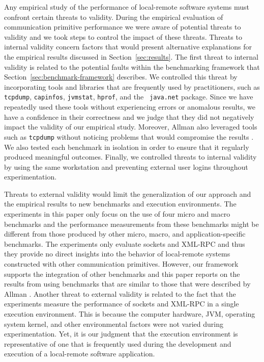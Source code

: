 \documentclass{sig-alternate}
\begin{document}
Any empirical study of the performance of local-remote software
systems must confront certain threats to validity.  During the
empirical evaluation of communication primitive performance we were
aware of potential threats to validity and we took steps to control
the impact of these threats.  Threats to internal validity concern
factors that would present alternative explanations for the empirical
results discussed in Section~\ref{sec:results}.  The first threat to
internal validity is related to the potential faults within the
benchmarking framework that Section~\ref{sec:benchmark-framework}
describes.  We controlled this threat by incorporating tools and
libraries that are frequently used by practitioners, such as {\tt
  tcpdump}, {\tt capinfos}, {\tt jvmstat}, {\tt hprof}, and the {\tt
  java.net} package.  Since we have repeatedly used these tools
without experiencing errors or anomalous results, we have a confidence
in their correctness and we judge that they did not negatively impact
the validity of our empirical study.  Moreover, Allman also leveraged
tools such as {\tt tcpdump} without noticing problems that would
compromise the results \cite{allman-per}.  We also tested each
benchmark in isolation in order to ensure that it regularly produced
meaningful outcomes.  Finally, we controlled threats to internal
validity by using the same workstation and preventing external user
logins throughout experimentation.

Threats to external validity would limit the generalization of our
approach and the empirical results to new benchmarks and execution
environments.  The experiments in this paper only focus on the use of
four micro and macro benchmarks and the performance measurements from
these benchmarks might be different from those produced by other
micro, macro, and application-specific benchmarks.  The experiments
only evaluate sockets and XML-RPC and thus they provide no direct
insights into the behavior of local-remote systems constructed with
other communication primitives.  However, our framework supports the
integration of other benchmarks and this paper reports on the results
from using benchmarks that are similar to those that were described by
Allman \cite{allman-per}.  Another threat to external validity is
related to the fact that the experiments measure the performance of
sockets and XML-RPC in a single execution environment. This is because
the computer hardware, JVM, operating system kernel, and other
environmental factors were not varied during experimentation.  Yet, it
is our judgment that the execution environment is representative of
one that is frequently used during the development and execution of a
local-remote software application.
\end{document}

